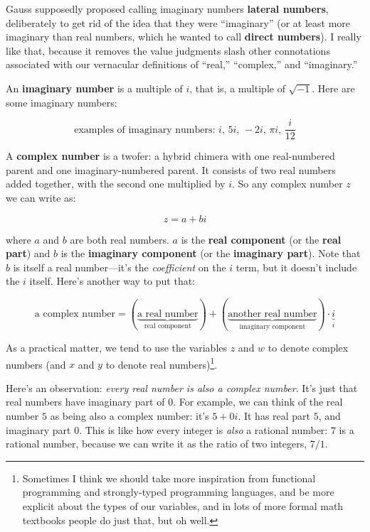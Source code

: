 \documentclass[
]{article}
\begin{document}
Gauss supposedly proposed calling imaginary numbers \textbf{lateral
numbers}, deliberately to get rid of the idea that they were
``imaginary'' (or at least more imaginary than real numbers, which he
wanted to call \textbf{direct numbers}). I really like that, because it
removes the value judgments slash other connotations associated with our
vernacular definitions of ``real,'' ``complex,'' and ``imaginary.''

An \textbf{imaginary number} is a multiple of \(i\), that is, a multiple
of \(\sqrt{-1}\). Here are some imaginary numbers:

\[\text{examples of imaginary numbers: } i,\, 5i,\, -2i,\, \pi i,\, \frac{i}{12}\]

A \textbf{complex number} is a twofer: a hybrid chimera with one
real-numbered parent and one imaginary-numbered parent. It consists of
two real numbers added together, with the second one multiplied by
\(i\). So any complex number \(z\) we can write as:

\[z = a + bi\]

where \(a\) and \(b\) are both real numbers. \(a\) is the \textbf{real
component} (or the \textbf{real part}) and \(b\) is the
\textbf{imaginary component} (or the \textbf{imaginary part}). Note that
\(b\) is itself a real number---it's the \emph{coefficient} on the \(i\)
term, but it doesn't include the \(i\) itself. Here's another way to put
that:

\[\text{a complex number} = (\underbrace{\text{a real number}}_{\text{real component}}) + (\underbrace{\text{another real number}}_{\text{imaginary component}})\cdot \underbrace{i}_{i}\]

As a practical matter, we tend to use the variables \(z\) and \(w\) to
denote complex numbers (and \(x\) and \(y\) to denote real
numbers)\footnote{Sometimes I think we should take more inspiration from functional programming and strongly-typed programming languages, and be more explicit about the types of our variables, and in lots of more formal math textbooks people do just that, but oh well.}.

Here's an observation: \emph{every real number is also a complex
number}. It's just that real numbers have imaginary part of \(0\). For
example, we can think of the real number \(5\) as being also a complex
number: it's \(5+0i\). It has real part \(5\), and imaginary part \(0\).
This is like how every integer is \emph{also} a rational number: \(7\)
is a rational number, because we can write it as the ratio of two
integers, \(7/1\).
\end{document}
